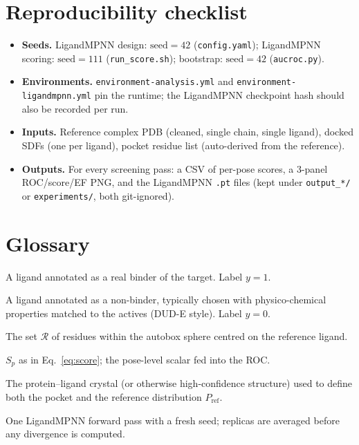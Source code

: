 \documentclass[11pt]{article}
\begin{document}
\section{Reproducibility checklist}

\begin{itemize}[leftmargin=*]
  \item \textbf{Seeds.} LigandMPNN design: $\mathrm{seed}=42$
    (\texttt{config.yaml}); LigandMPNN scoring: $\mathrm{seed}=111$
    (\texttt{run\_score.sh}); bootstrap: $\mathrm{seed}=42$
    (\texttt{aucroc.py}).
  \item \textbf{Environments.} \texttt{environment-analysis.yml} and
    \texttt{environment-ligandmpnn.yml} pin the runtime; the LigandMPNN
    checkpoint hash should also be recorded per run.
  \item \textbf{Inputs.} Reference complex PDB (cleaned, single chain,
    single ligand), docked SDFs (one per ligand), pocket residue list
    (auto-derived from the reference).
  \item \textbf{Outputs.} For every screening pass:
    a CSV of per-pose scores, a 3-panel ROC/score/EF PNG, and the
    LigandMPNN \texttt{.pt} files (kept under \texttt{output\_*/} or
    \texttt{experiments/}, both git-ignored).
\end{itemize}

\section{Glossary}

\begin{description}[leftmargin=2.5cm, style=nextline]
  \item[Active] A ligand annotated as a real binder of the target. Label
    $y=1$.
  \item[Decoy] A ligand annotated as a non-binder, typically chosen with
    physico-chemical properties matched to the actives (DUD-E style).
    Label $y=0$.
  \item[Pocket] The set $\mathcal{R}$ of residues within the autobox
    sphere centred on the reference ligand.
  \item[Perturbation score] $S_p$ as in Eq.~\eqref{eq:score}; the
    pose-level scalar fed into the ROC.
  \item[Reference complex] The protein--ligand crystal (or otherwise
    high-confidence structure) used to define both the pocket and the
    reference distribution $P_{\mathrm{ref}}$.
  \item[Replica] One LigandMPNN forward pass with a fresh seed; replicas
    are averaged before any divergence is computed.
\end{description}
\end{document}
